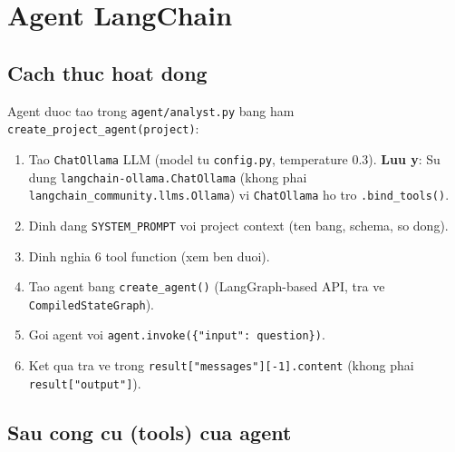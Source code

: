 \documentclass[12pt,a4paper]{article}
\begin{document}
\section{Agent LangChain}

\subsection{Cach thuc hoat dong}

Agent duoc tao trong \texttt{agent/analyst.py} bang ham
\texttt{create\_project\_agent(project)}:

\begin{enumerate}
  \item Tao \texttt{ChatOllama} LLM (model tu \texttt{config.py}, temperature 0.3).
        \textbf{Luu y}: Su dung \texttt{langchain-ollama.ChatOllama} (khong phai
        \texttt{langchain\_community.llms.Ollama}) vi \texttt{ChatOllama} ho tro
        \texttt{.bind\_tools()}.
  \item Dinh dang \texttt{SYSTEM\_PROMPT} voi project context (ten bang,
        schema, so dong).
  \item Dinh nghia 6 tool function (xem ben duoi).
  \item Tao agent bang \texttt{create\_agent()} (LangGraph-based API,
        tra ve \texttt{CompiledStateGraph}).
  \item Goi agent voi \texttt{agent.invoke(\{"input": question\})}.
  \item Ket qua tra ve trong \texttt{result["messages"][-1].content}
        (khong phai \texttt{result["output"]}).
\end{enumerate}

\subsection{Sau cong cu (tools) cua agent}
\end{document}
